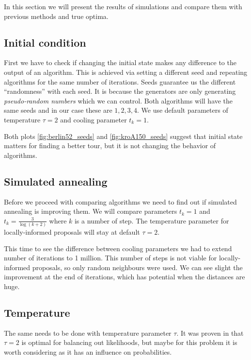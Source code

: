 In this section we will present the results of simulations and compare them with previous methods and true optima.

\subsection{Initial condition}
	First we have to check if changing the initial state makes any difference to the output of an algorithm. This is achieved via setting a different seed and repeating algorithms for the same number of iterations. Seeds guarantee us the different ``randomness'' with each seed. It is because the generators are only generating \textit{pseudo-random numbers} which we can control. Both algorithms will have the same seeds and in our case these are $1,2,3,4$. We use default parameters of temperature $\tau=2$ and cooling parameter $t_k=1$.
	

	Both plots \ref{fig:berlin52_seeds} and \ref{fig:kroA150_seeds} suggest that initial state matters for finding a better tour, but it is not changing the behavior of algorithms.
	
\subsection{Simulated annealing}
	Before we proceed with comparing algorithms we need to find out if simulated annealing is improving them. We will compare parameters $t_k=1$ and $t_k= \frac{3}{\log(k+2)}$ where $k$ is a number of step. The temperature parameter for locally-informed proposals will stay at default $\tau=2$.
	
	
	
	This time to see the difference between cooling parameters we had to extend number of iterations to 1 million. This number of steps is not viable for locally-informed proposals, so only random neighbours were used. We can see slight the improvement at the end of iterations, which has potential when the distances are huge. 
	
\subsection{Temperature}
	The same needs to be done with temperature parameter $\tau$. It was proven in \cite{zanella2020informed} that $\tau=2$ is optimal for balancing out likelihoods, but maybe for this problem it is worth considering as it has an influence on probabilities.
	
